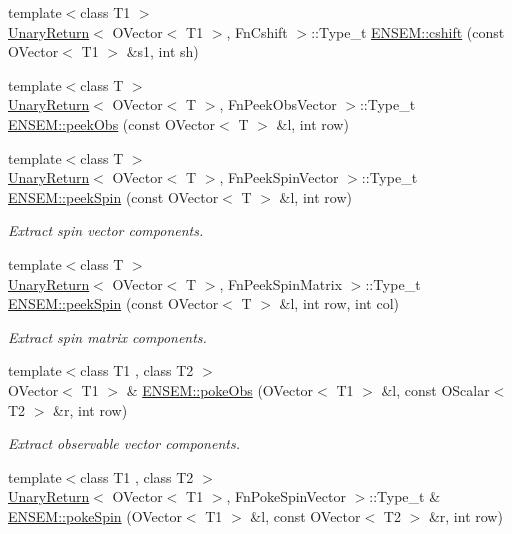 \begin{DoxyCompactItemize}
{\footnotesize template$<$class T1 $>$ }\\\mbox{\hyperlink{structUnaryReturn}{Unary\+Return}}$<$ O\+Vector$<$ T1 $>$, Fn\+Cshift $>$\+::Type\+\_\+t \mbox{\hyperlink{group__obsvector_ga62bf87c2f25855df9774ccd89281b555}{E\+N\+S\+E\+M\+::cshift}} (const O\+Vector$<$ T1 $>$ \&s1, int sh)
\item 
{\footnotesize template$<$class T $>$ }\\\mbox{\hyperlink{structUnaryReturn}{Unary\+Return}}$<$ O\+Vector$<$ T $>$, Fn\+Peek\+Obs\+Vector $>$\+::Type\+\_\+t \mbox{\hyperlink{group__obsvector_ga8d085844df795594177550f3748fb6a5}{E\+N\+S\+E\+M\+::peek\+Obs}} (const O\+Vector$<$ T $>$ \&l, int row)
\item 
{\footnotesize template$<$class T $>$ }\\\mbox{\hyperlink{structUnaryReturn}{Unary\+Return}}$<$ O\+Vector$<$ T $>$, Fn\+Peek\+Spin\+Vector $>$\+::Type\+\_\+t \mbox{\hyperlink{group__obsvector_ga53ddc54421a1f3fa7ee2ed55f15627a6}{E\+N\+S\+E\+M\+::peek\+Spin}} (const O\+Vector$<$ T $>$ \&l, int row)
\begin{DoxyCompactList}\small\item\em Extract spin vector components. \end{DoxyCompactList}\item 
{\footnotesize template$<$class T $>$ }\\\mbox{\hyperlink{structUnaryReturn}{Unary\+Return}}$<$ O\+Vector$<$ T $>$, Fn\+Peek\+Spin\+Matrix $>$\+::Type\+\_\+t \mbox{\hyperlink{group__obsvector_gab454ed8a07dbd29bbb2851736c4635e6}{E\+N\+S\+E\+M\+::peek\+Spin}} (const O\+Vector$<$ T $>$ \&l, int row, int col)
\begin{DoxyCompactList}\small\item\em Extract spin matrix components. \end{DoxyCompactList}\item 
{\footnotesize template$<$class T1 , class T2 $>$ }\\O\+Vector$<$ T1 $>$ \& \mbox{\hyperlink{group__obsvector_gab682185c869b882a5be5eedf4fee8e74}{E\+N\+S\+E\+M\+::poke\+Obs}} (O\+Vector$<$ T1 $>$ \&l, const O\+Scalar$<$ T2 $>$ \&r, int row)
\begin{DoxyCompactList}\small\item\em Extract observable vector components. \end{DoxyCompactList}\item 
{\footnotesize template$<$class T1 , class T2 $>$ }\\\mbox{\hyperlink{structUnaryReturn}{Unary\+Return}}$<$ O\+Vector$<$ T1 $>$, Fn\+Poke\+Spin\+Vector $>$\+::Type\+\_\+t \& \mbox{\hyperlink{group__obsvector_gadea0fd5400f7060852f3cd990c3a8ab3}{E\+N\+S\+E\+M\+::poke\+Spin}} (O\+Vector$<$ T1 $>$ \&l, const O\+Vector$<$ T2 $>$ \&r, int row)

\end{DoxyCompactItemize}

